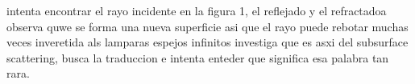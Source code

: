 intenta encontrar el rayo incidente en la figura 1, el reflejado y el refractadoa
observa quwe se forma una nueva superficie asi que el rayo puede rebotar muchas veces
inveretida als lamparas espejos infinitos
investiga que es asxi del subsurface scattering, busca la traduccion e intenta enteder que significa esa palabra tan rara.